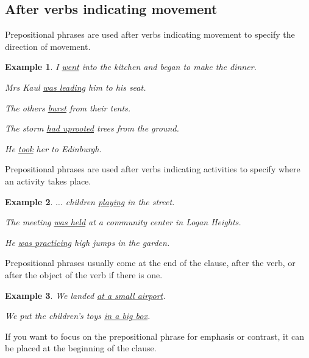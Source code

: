 \documentclass[oneside]{book}
\numberwithin{equation}{section}
\newtheorem{example}{Example}[section]
\begin{document}
\subsection{After verbs indicating movement}
\noindent{} Prepositional phrases are used after verbs indicating movement to specify the direction of movement.
\begin{example}
    I \underline{went} into the kitchen and began to make the dinner.
    
    Mrs Kaul \underline{was leading} him to his seat.
    
    The others \underline{burst} from their tents.
    
    The storm \underline{had uprooted} trees from the ground.
    
    He \underline{took} her to Edinburgh.
\end{example}
%
\noindent{} Prepositional phrases are used after verbs indicating activities to specify where an activity takes place.
\begin{example}
    $\ldots$ children \underline{playing} in the street.
    
    The meeting \underline{was held} at a community center in Logan Heights.
    
    He \underline{was practicing} high jumps in the garden.
\end{example}
%
\noindent{} Prepositional phrases usually come at the end of the clause, after the verb, or after the object of the verb if there is one.
\begin{example}
    We landed \underline{at a small airport}.
    
    We put the children's toys \underline{in a big box}.
\end{example}
%
\noindent{} If you want to focus on the prepositional phrase for emphasis or contrast, it can be placed at the beginning of the clause.
\end{document}
